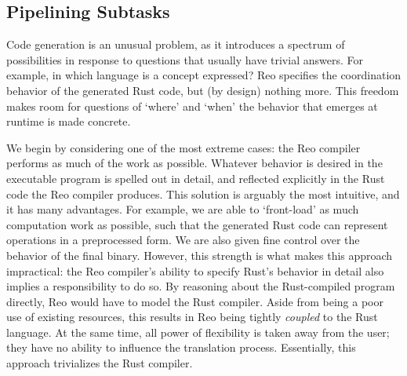 

\subsection{Pipelining Subtasks}
\label{sec:decoupling_reo_rust}

Code generation is an unusual problem, as it introduces a spectrum of possibilities in response to questions that usually have trivial answers. For example, in which language is a concept expressed? Reo specifies the coordination behavior of the generated Rust code, but (by design) nothing more. This freedom makes room for questions of `where' and `when' the behavior that emerges at runtime is made concrete. 

We begin by considering one of the most extreme cases: the Reo compiler performs as much of the work as possible. Whatever behavior is desired in the executable program is spelled out in detail, and reflected explicitly in the Rust code the Reo compiler produces. This solution is arguably the most intuitive, and it has many advantages. For example, we are able to `front-load' as much computation work as possible, such that the generated Rust code can represent operations in a preprocessed form. We are also given fine control over the behavior of the final binary. However, this strength is what makes this approach impractical: the Reo compiler's ability to specify Rust's behavior in detail also implies a responsibility to do so. By reasoning about the Rust-compiled program directly, Reo would have to model the Rust compiler. Aside from being a poor use of existing resources, this results in Reo being tightly \textit{coupled} to the Rust language. At the same time, all power of flexibility is taken away from the user; they have no ability to influence the translation process. Essentially, this approach trivializes the Rust compiler.

